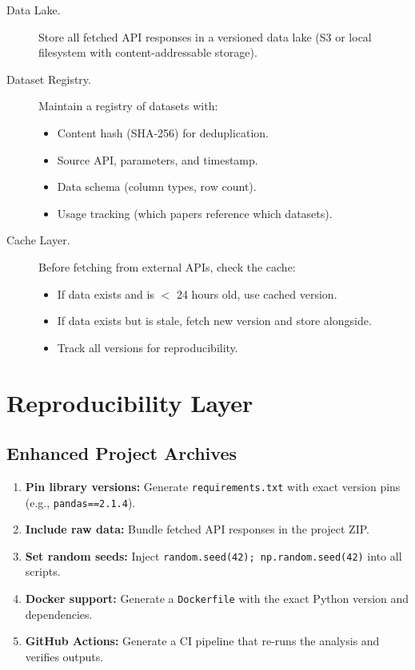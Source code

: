 \begin{description}
  \item[Data Lake.] Store all fetched API responses in a versioned data lake (S3 or local filesystem with content-addressable storage).

  \item[Dataset Registry.] Maintain a registry of datasets with:
  \begin{itemize}
    \item Content hash (SHA-256) for deduplication.
    \item Source API, parameters, and timestamp.
    \item Data schema (column types, row count).
    \item Usage tracking (which papers reference which datasets).
  \end{itemize}

  \item[Cache Layer.] Before fetching from external APIs, check the cache:
  \begin{itemize}
    \item If data exists and is $<$ 24 hours old, use cached version.
    \item If data exists but is stale, fetch new version and store alongside.
    \item Track all versions for reproducibility.
  \end{itemize}
\end{description}

\section{Reproducibility Layer}
\label{sec:improve:reproducibility}

\subsection{Enhanced Project Archives}

\begin{enumerate}
  \item \textbf{Pin library versions:} Generate \texttt{requirements.txt} with exact version pins (e.g., \texttt{pandas==2.1.4}).
  \item \textbf{Include raw data:} Bundle fetched API responses in the project ZIP.
  \item \textbf{Set random seeds:} Inject \texttt{random.seed(42); np.random.seed(42)} into all scripts.
  \item \textbf{Docker support:} Generate a \texttt{Dockerfile} with the exact Python version and dependencies.
  \item \textbf{GitHub Actions:} Generate a CI pipeline that re-runs the analysis and verifies outputs.
\end{enumerate}

